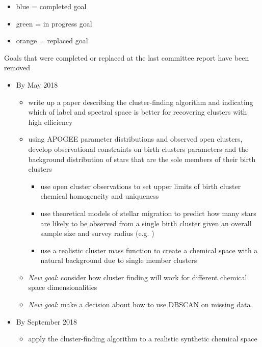 \documentclass[11pt]{article}
\begin{document}
    \begin{itemize}
    	\item {\color{RoyalBlue}blue} = completed goal
    	\item {\color{ForestGreen} green} = in progress goal
    	\item {\color{BurntOrange} orange} = replaced goal
    \end{itemize}

Goals that were completed or replaced at the last committee report have been removed

\begin{itemize}

\item By May 2018
\begin{itemize}
\item {\color{ForestGreen} write up a paper describing the cluster-finding algorithm and indicating which of label and spectral space is better for recovering clusters with high efficiency}
\item {\color{RoyalBlue}using APOGEE parameter distributions and observed open clusters, develop observational constraints on birth clusters parameters and the background distribution of stars that are the sole members of their birth clusters}
\begin{itemize}
\item {\color{RoyalBlue} use open cluster observations to set upper limits of birth cluster chemical homogeneity and uniqueness}
\item use theoretical models of stellar migration to predict how many stars are likely to be observed from a single birth cluster given an overall sample size and survey radius (e.g. \citealt{Ting2015})
\item {\color{RoyalBlue} use a realistic cluster mass function to create a chemical space with a natural background due to single member clusters}
\end{itemize}
\item \emph{New goal}: {\color{RoyalBlue} consider how cluster finding will work for different chemical space dimensionalities}
\item \emph{New goal}: {\color{RoyalBlue} make a decision about how to use DBSCAN on missing data}
\end{itemize}
\item By September 2018
\begin{itemize}
\item {\color{RoyalBlue}apply the cluster-finding algorithm to a realistic synthetic chemical space} 

\end{itemize}
\end{itemize}
\end{document}

